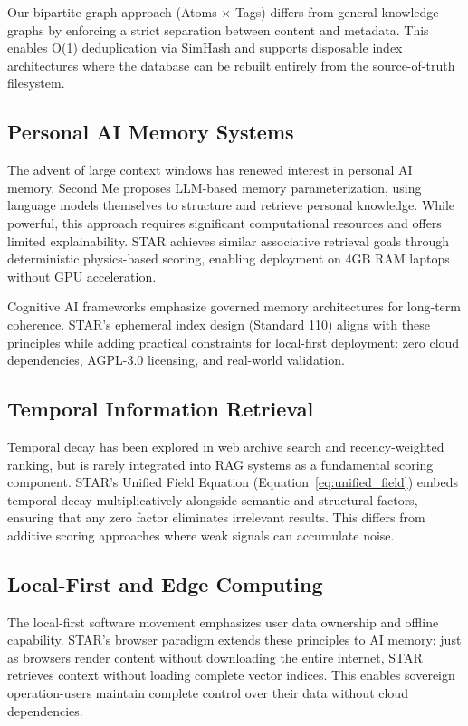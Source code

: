 Our bipartite graph approach (Atoms $\times$ Tags) differs from general knowledge graphs by enforcing a strict separation between content and metadata. This enables O(1) deduplication via SimHash \cite{charikar2002similar} and supports disposable index architectures where the database can be rebuilt entirely from the source-of-truth filesystem.

\subsection{Personal AI Memory Systems}

The advent of large context windows has renewed interest in personal AI memory. Second Me \cite{wei2025second} proposes LLM-based memory parameterization, using language models themselves to structure and retrieve personal knowledge. While powerful, this approach requires significant computational resources and offers limited explainability. STAR achieves similar associative retrieval goals through deterministic physics-based scoring, enabling deployment on 4GB RAM laptops without GPU acceleration.

Cognitive AI frameworks \cite{salas2025cognitive} emphasize governed memory architectures for long-term coherence. STAR's ephemeral index design (Standard 110) aligns with these principles while adding practical constraints for local-first deployment: zero cloud dependencies, AGPL-3.0 licensing, and real-world validation.

\subsection{Temporal Information Retrieval}

Temporal decay has been explored in web archive search \cite{kanhabua2008surviving} and recency-weighted ranking, but is rarely integrated into RAG systems as a fundamental scoring component. STAR's Unified Field Equation (Equation~\ref{eq:unified_field}) embeds temporal decay multiplicatively alongside semantic and structural factors, ensuring that any zero factor eliminates irrelevant results. This differs from additive scoring approaches where weak signals can accumulate noise.

\subsection{Local-First and Edge Computing}

The local-first software movement \cite{haque2023local} emphasizes user data ownership and offline capability. STAR's browser paradigm extends these principles to AI memory: just as browsers render content without downloading the entire internet, STAR retrieves context without loading complete vector indices. This enables sovereign operation-users maintain complete control over their data without cloud dependencies.

